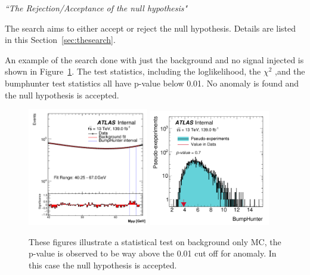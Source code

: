 \textit{``The Rejection/Acceptance of the null hypothesis"}

The search aims to either accept or reject the null hypothesis. Details are listed in this Section~\ref{sec:thesearch}.

An example of the search done with just the background and no signal injected is shown in Figure~\ref{fig:searchnull}. The test statistics, including 
the loglikelihood, the $\chi^{2}$ ,and the bumphunter test statistics all have p-value below 0.01. No anomaly is found and the null hypothesis is accepted.
    
\begin{figure}[!htb]
    \begin{center}

        \includegraphics[width=0.47\textwidth]{figures/chapter_dimuon/Nominal}        
        \includegraphics[width=0.47\textwidth]{figures/chapter_dimuon/bumpHunterStatPlot}
        \caption{
        These figures illustrate a statistical test on background only MC, the p-value is observed to be way above the 0.01 cut off for anomaly. In  this case the null hypothesis is accepted.
        }
    \label{fig:searchnull}
    \end{center}
\end{figure}
\FloatBarrier

